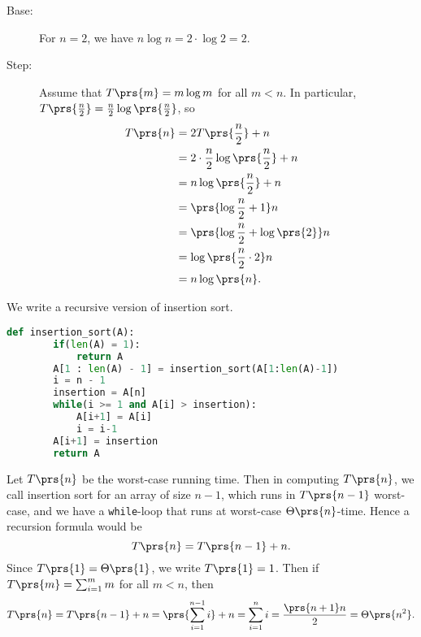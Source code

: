 \documentclass[oneside]{scrbook}
\newcommand{\codeword}[1]{\texttt{#1}}
\theoremstyle{definition}
\begin{document}
\begin{exercise}
    \begin{description}
        \item[Base:]
            For $n = 2$, we have $n \log n = 2 \cdot \log 2 = 2$.
        \item[Step:]
            Assume that $T\prs{m} = m \log m$ for all $m < n$. In particular, $T\prs{\frac{n}{2}} = \frac{n}{2} \log\prs{\frac{n}{2}}$, so
            \begin{align*}
                T\prs{n} &= 2 T\prs{\frac{n}{2}} + n
                \\&= 2 \cdot \frac{n}{2} \log\prs{\frac{n}{2}} + n
                \\&= n \log \prs{\frac{n}{2}} + n
                \\&= \prs{\log \frac{n}{2} + 1} n
                \\&= \prs{\log \frac{n}{2} + \log\prs{2}} n
                \\&= \log\prs{\frac{n}{2} \cdot 2} n
                \\&= n \log\prs{n} \text{.}
            \end{align*}
    \end{description}
\end{exercise}

\begin{exercise}
    We write a recursive version of insertion sort.
    \begin{lstlisting}[language=Python]
    def insertion_sort(A):
        if(len(A) = 1):
            return A
        A[1 : len(A) - 1] = insertion_sort(A[1:len(A)-1])
        i = n - 1
        insertion = A[n]
        while(i >= 1 and A[i] > insertion):
            A[i+1] = A[i]
            i = i-1
        A[i+1] = insertion
        return A
    \end{lstlisting}

    Let $T\prs{n}$ be the worst-case running time. Then in computing $T\prs{n}$, we call insertion sort for an array of size $n-1$, which runs in $T\prs{n-1}$ worst-case, and we have a \codeword{while}-loop that runs at worst-case $\Theta\prs{n}$-time.
    Hence a recursion formula would be
    \[T\prs{n} = T\prs{n - 1} + n \text{.}\]
    Since $T\prs{1} = \Theta\prs{1}$, we write $T\prs{1} = 1$. Then if $T\prs{m} = \sum_{i = 1}^m m$ for all $m < n$, then
    \[T\prs{n} = T\prs{n-1} + n = \prs{\sum_{i=1}^{n-1} i} + n = \sum_{i=1}^n i = \frac{\prs{n+1}n}{2} = \Theta\prs{n^2} \text{.}\]
\end{exercise}
\end{document}
